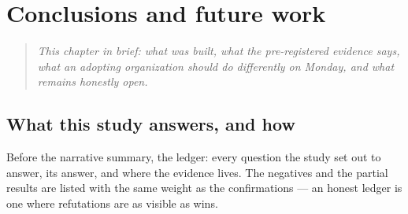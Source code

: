 \chapter{Conclusions and future work}
\label{ch:conclusions}

\begin{quote}\itshape
This chapter in brief: what was built, what the pre-registered evidence says, what an
adopting organization should do differently on Monday, and what remains honestly open.
\end{quote}



\section{What this study answers, and how}
\label{sec:questions-answered}

Before the narrative summary, the ledger: every question the study set out to answer, its
answer, and where the evidence lives. The negatives and the partial results are listed with
the same weight as the confirmations --- an honest ledger is one where refutations are as
visible as wins.

